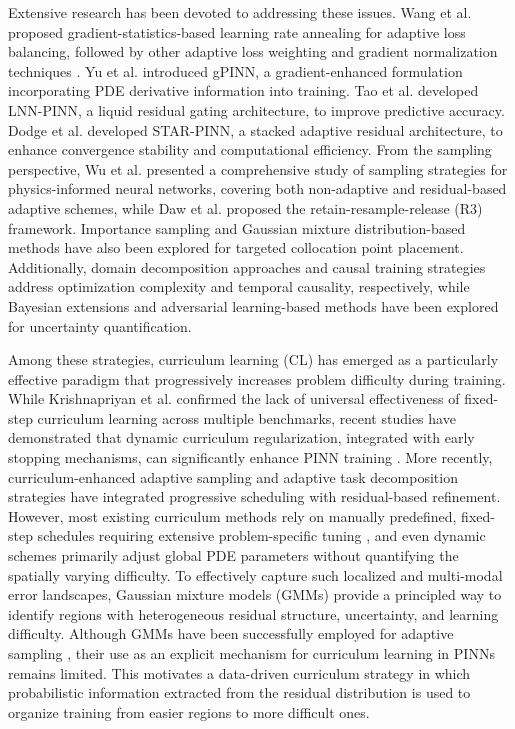 \documentclass{article}
\theoremstyle{plain}
\theoremstyle{definition}
\theoremstyle{remark}
\begin{document}
	Extensive research has been devoted to addressing these issues. Wang et al. \cite{Wang16} proposed gradient-statistics-based learning rate annealing for adaptive loss balancing, followed by other adaptive loss weighting \cite{Zhu25,Xiang26} and gradient normalization techniques \cite{Chen27}. Yu et al. \cite{Yu28} introduced gPINN, a gradient-enhanced formulation incorporating PDE derivative information into training. Tao et al. \cite{Tao29} developed LNN-PINN, a liquid residual gating architecture, to improve predictive accuracy. Dodge et al. \cite{Dodge30} developed STAR-PINN, a stacked adaptive residual architecture, to enhance convergence stability and computational efficiency. From the sampling perspective, Wu et al. \cite{Wu24} presented a comprehensive study of sampling strategies for physics-informed neural networks, covering both non-adaptive and residual-based adaptive schemes, while Daw et al. \cite{Daw23} proposed the retain-resample-release (R3) framework. Importance sampling \cite{Nabian31,Zhang32} and Gaussian mixture distribution-based methods \cite{Jiao33} have also been explored for targeted collocation point placement. Additionally, domain decomposition approaches \cite{Shukla34,Jagtap35} and causal training strategies \cite{Wang36} address optimization complexity and temporal causality, respectively, while Bayesian extensions \cite{Zhang37} and adversarial learning-based methods \cite{Yang38} have been explored for uncertainty quantification.
	
	Among these strategies, curriculum learning (CL) \cite{Bengio39} has emerged as a particularly effective paradigm that progressively increases problem difficulty during training. While Krishnapriyan et al. \cite{Krishnapriyan18} confirmed the lack of universal effectiveness of fixed-step curriculum learning across multiple benchmarks, recent studies have demonstrated that dynamic curriculum regularization, integrated with early stopping mechanisms, can significantly enhance PINN training \cite{Monaco40,Duffy41}. More recently, curriculum-enhanced adaptive sampling \cite{Cetinkaya42} and adaptive task decomposition strategies \cite{Yang43} have integrated progressive scheduling with residual-based refinement. However, most existing curriculum methods rely on manually predefined, fixed-step schedules requiring extensive problem-specific tuning \cite{Krishnapriyan18,Monaco40}, and even dynamic schemes \cite{Duffy41} primarily adjust global PDE parameters without quantifying the spatially varying difficulty. To effectively capture such localized and multi-modal error landscapes, Gaussian mixture models (GMMs) provide a principled way to identify regions with heterogeneous residual structure, uncertainty, and learning difficulty. Although GMMs have been successfully employed for adaptive sampling \cite{Daw23,Wu24,Nabian31,Zhang32,Jiao33}, their use as an explicit mechanism for curriculum learning in PINNs remains limited. This motivates a data-driven curriculum strategy in which probabilistic information extracted from the residual distribution is used to organize training from easier regions to more difficult ones.
	
\end{document}
